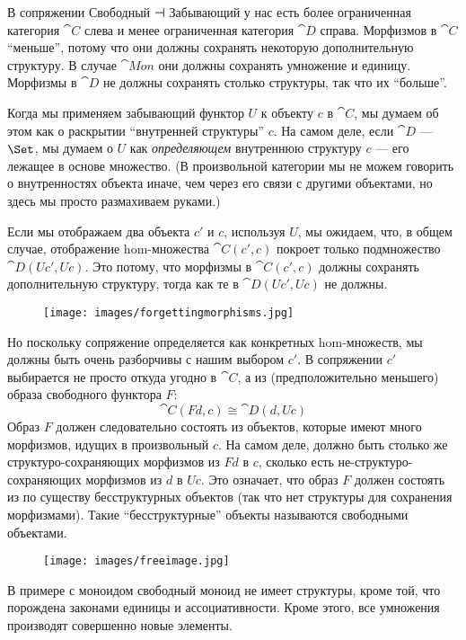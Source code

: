 В сопряжении Свободный ⊣ Забывающий у нас есть более ограниченная
категория $\cat{C}$ слева и менее ограниченная категория $\cat{D}$
справа. Морфизмов в $\cat{C}$ ``меньше'', потому что они должны
сохранять некоторую дополнительную структуру. В случае $\cat{Mon}$ они
должны сохранять умножение и единицу. Морфизмы в $\cat{D}$ не
должны сохранять столько структуры, так что их ``больше''.

Когда мы применяем забывающий функтор $U$ к объекту $c$ в
$\cat{C}$, мы думаем об этом как о раскрытии ``внутренней структуры''
$c$. На самом деле, если $\cat{D}$ --- $\Set$, мы думаем о $U$
как \emph{определяющем} внутреннюю структуру $c$ --- его
лежащее в основе множество. (В произвольной категории мы не можем говорить о
внутренностях объекта иначе, чем через его связи с другими
объектами, но здесь мы просто размахиваем руками.)

Если мы отображаем два объекта $c'$ и $c$, используя $U$,
мы ожидаем, что, в общем случае, отображение hom-множества
$\cat{C}(c', c)$ покроет только подмножество
$\cat{D}(U c', U c)$. Это потому, что морфизмы в
$\cat{C}(c', c)$ должны сохранять дополнительную структуру,
тогда как те в $\cat{D}(U c', U c)$ не должны.

\begin{figure}[H]
  \centering
  \texttt{[image: images/forgettingmorphisms.jpg]}
\end{figure}

\noindent
Но поскольку сопряжение определяется как 
конкретных hom-множеств, мы должны быть очень разборчивы с нашим выбором
$c'$. В сопряжении $c'$ выбирается не
просто откуда угодно в $\cat{C}$, а из (предположительно меньшего) образа
свободного функтора $F$:
\[\cat{C}(F d, c) \cong \cat{D}(d, U c)\]
Образ $F$ должен следовательно состоять из объектов, которые имеют много
морфизмов, идущих в произвольный $c$. На самом деле, должно быть
столько же структуро-сохраняющих морфизмов из $F d$ в $c$,
сколько есть не-структуро-сохраняющих морфизмов из $d$ в
$U c$. Это означает, что образ $F$ должен состоять из
по существу бесструктурных объектов (так что нет структуры для
сохранения морфизмами). Такие ``бесструктурные'' объекты называются свободными
объектами.

\begin{figure}[H]
  \centering
  \texttt{[image: images/freeimage.jpg]}
\end{figure}

\noindent
В примере с моноидом свободный моноид не имеет структуры, кроме той, что
порождена законами единицы и ассоциативности. Кроме этого, все
умножения производят совершенно новые элементы.

